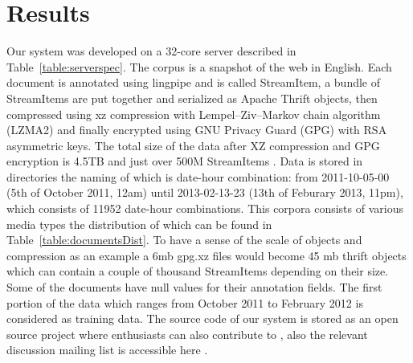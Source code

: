
\section{Results}
\label{sec:results}

 Our system was developed on a 32-core server described in Table~\ref{table:serverspec}. The corpus is a snapshot of the web in English. Each document is annotated using lingpipe and is called StreamItem, a bundle of StreamItems are put together and serialized as Apache Thrift objects, then compressed using xz compression with Lempel–Ziv–Markov chain algorithm (LZMA2) and finally encrypted using GNU Privacy Guard (GPG) with RSA asymmetric keys. The total size of the data after XZ compression and GPG encryption is 4.5TB and just over 500M StreamItems \cite{s3}. Data is stored in directories the naming of which is date-hour combination: from 2011-10-05-00 (5th of October 2011, 12am) until 2013-02-13-23 (13th of Feburary 2013, 11pm), which consists of 11952 date-hour combinations. This corpora consists of various media types the distribution of which can be found in Table~\ref{table:documentsDist}. To have a sense of the scale of objects and compression as an example a 6mb gpg.xz files would become 45 mb thrift objects which can contain a couple of thousand StreamItems depending on their size. Some of the documents have null values for their annotation fields. The first portion of the data which ranges from October 2011 to February 2012 is considered as training data. The source code of our system is stored as an open source project where enthusiasts can also contribute to \cite{github}, also the relevant discussion mailing list is accessible here \cite{googlegroups}.
 
